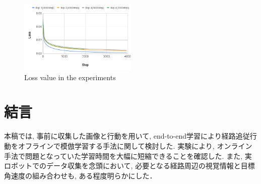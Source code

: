 \documentclass{ujarticle}
\begin{document}
\begin{figure}[h]
		\centering
		\includegraphics[width=0.5\textwidth]{img/loss_compe_fix.png}
		\caption{Loss value in the experiments}
		\label{Fig:loss}
\end{figure}

\section{結言}%
本稿では, 事前に収集した画像と行動を用いて, end-to-end学習により経路追従行動をオフラインで模倣学習する手法に関して検討した. 実験により, オンライン手法で問題となっていた学習時間を大幅に短縮できることを確認した. また, 実ロボットでのデータ収集を念頭において, 必要となる経路周辺の視覚情報と目標角速度の組み合わせも, ある程度明らかにした．
\end{document}
